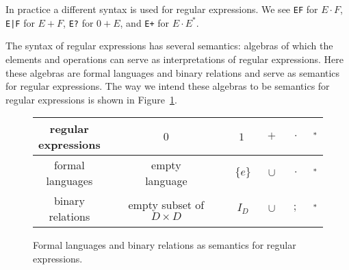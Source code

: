 \documentclass[preprint,11pt]{elsarticle}
\begin{document}
In practice a different syntax is used for regular expressions.
We see {\tt EF} for $E\cdot F$,
{\tt E|F} for $E+F$,
{\tt E?} for $0+E$,
and
{\tt E+} for $E\cdot E^*$.

The syntax of regular expressions has several semantics:
algebras of which the elements and operations
can serve as interpretations of regular expressions.
Here these algebras are formal languages and binary relations
and serve as semantics for regular expressions. 
The way we intend these algebras to be semantics for regular
expressions is shown in Figure~\ref{fig:REsem}.

\begin{figure}[htbp]
\begin{center}
\begin{minipage}{4in}
\begin{tabular}{c|c|c|c|c|c}
\parbox{20mm}{regular\\ expressions\\[0mm]}
  & \parbox{10mm}{$0$}
    & \parbox{5mm}{$1$}
      & \parbox{5mm}{$\;+$}
        & \parbox{5mm}{$\;\cdot$}
          & \parbox{5mm}{$\;^*$}
 \\
\hline \hline
\parbox{20mm}{\vspace{2mm}formal\\ languages\\[0mm]}
  & \parbox{20mm}{empty\\ language}
    & \parbox{5mm}{$\;\{e\}$}
      & \parbox{5mm}{$\;\cup$}
        & \parbox{5mm}{$\;\cdot$}
          & \parbox{5mm}{$\;^*$}
 \\
\hline
\parbox{20mm}{\vspace{2mm}binary\\ relations\\[0mm]}
  & \parbox{20mm}{empty subset\\ of $D\times D$}
    & \parbox{5mm}{$\;I_D$}
      & \parbox{5mm}{$\;\cup$}
        & \parbox{5mm}{$\;;$}
          & \parbox{5mm}{$\;^*$}
 \\
\hline
\end{tabular}
\end{minipage}
\end{center}
\caption{\label{fig:REsem}
Formal languages and binary relations as
semantics for regular expressions.
}
\end{figure}
\end{document}
